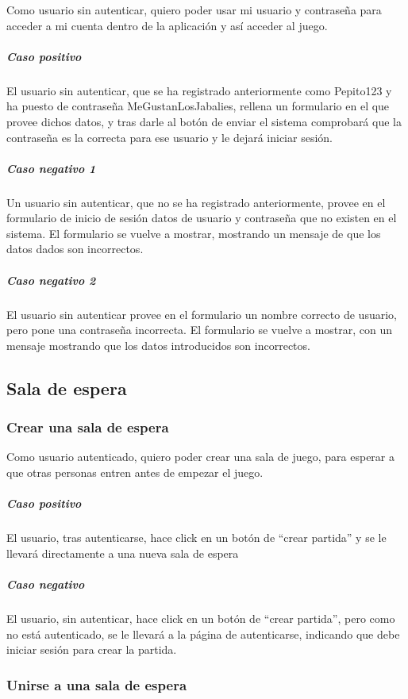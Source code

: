 Como usuario sin autenticar, quiero poder usar mi usuario y contraseña para acceder a mi cuenta dentro de la aplicación y así acceder al juego. 

\subparagraph{Caso positivo}

El usuario sin autenticar, que se ha registrado anteriormente como Pepito123 y ha puesto de contraseña MeGustanLosJabalies, rellena un formulario en el que provee dichos datos, y tras darle al botón de enviar el sistema comprobará que la contraseña es la correcta para ese usuario y le dejará iniciar sesión. 

\subparagraph{Caso negativo 1}

Un usuario sin autenticar, que no se ha registrado anteriormente, provee en el formulario de inicio de sesión datos de usuario y contraseña que no existen en el sistema. El formulario se vuelve a mostrar, mostrando un mensaje de que los datos dados son incorrectos. 

\subparagraph{Caso negativo 2}

El usuario sin autenticar provee en el formulario un nombre correcto de usuario, pero pone una contraseña incorrecta. El formulario se vuelve a mostrar, con un mensaje mostrando que los datos introducidos son incorrectos. 

\subsection{Sala de espera}

\subsubsection{Crear una sala de espera }

Como usuario autenticado, quiero poder crear una sala de juego, para esperar a que otras personas entren antes de empezar el juego. 

\subparagraph{Caso positivo}

El usuario, tras autenticarse, hace click en un botón de “crear partida” y se le llevará directamente a una nueva sala de espera 

\subparagraph{Caso negativo }

El usuario, sin autenticar, hace click en un botón de “crear partida”, pero como no está autenticado, se le llevará a la página de autenticarse, indicando que debe iniciar sesión para crear la partida. 

\subsubsection{Unirse a una sala de espera }

